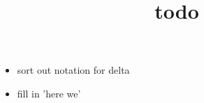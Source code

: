 \documentclass{article}
\title{todo}
\begin{document}
\maketitle
  \begin{itemize}
    \item sort out notation for delta
    \item fill in 'here we'
  \end{itemize}
\end{document}

